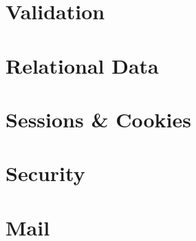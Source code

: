 \documentclass[b5paper,openany]{book}
\begin{document}
\chapter{Validation}


\chapter{Relational Data}


\chapter{Sessions \& Cookies}


\chapter{Security}


\chapter{Mail}








\end{document}
